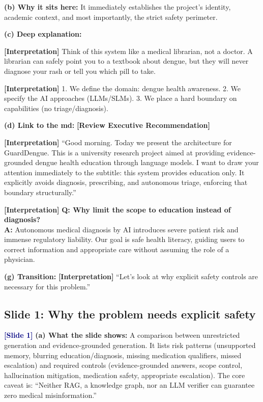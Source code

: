 \documentclass[11pt,a4paper]{article}
\newcommand{\origintag}[2]{\textcolor{#1}{\small\textbf{[#2]}}}
\begin{document}
\textbf{(b) Why it sits here:} It immediately establishes the project's identity, academic context, and most importantly, the strict safety perimeter.

\textbf{(c) Deep explanation:}
\begin{analogy}
\origintag{slate}{Interpretation} Think of this system like a medical librarian, not a doctor. A librarian can safely point you to a textbook about dengue, but they will never diagnose your rash or tell you which pill to take.
\end{analogy}
\origintag{slate}{Interpretation} 1. We define the domain: dengue health awareness. 2. We specify the AI approaches (LLMs/SLMs). 3. We place a hard boundary on capabilities (no triage/diagnosis).

\textbf{(d) Link to the md:} \origintag{amber}{Review Executive Recommendation}

\begin{sayit}
\origintag{slate}{Interpretation} ``Good morning. Today we present the architecture for GuardDengue. This is a university research project aimed at providing evidence-grounded dengue health education through language models. I want to draw your attention immediately to the subtitle: this system provides education only. It explicitly avoids diagnosis, prescribing, and autonomous triage, enforcing that boundary structurally.''
\end{sayit}

\begin{qa}
\origintag{slate}{Interpretation} \textbf{Q: Why limit the scope to education instead of diagnosis?} \\
\textbf{A:} Autonomous medical diagnosis by AI introduces severe patient risk and immense regulatory liability. Our goal is safe health literacy, guiding users to correct information and appropriate care without assuming the role of a physician.
\end{qa}
\textbf{(g) Transition:} \origintag{slate}{Interpretation} ``Let's look at why explicit safety controls are necessary for this problem.''

\subsection{Slide 1: Why the problem needs explicit safety}
\origintag{navy}{Slide 1} 
\textbf{(a) What the slide shows:} A comparison between unrestricted generation and evidence-grounded generation. It lists risk patterns (unsupported memory, blurring education/diagnosis, missing medication qualifiers, missed escalation) and required controls (evidence-grounded answers, scope control, hallucination mitigation, medication safety, appropriate escalation). The core caveat is: ``Neither RAG, a knowledge graph, nor an LLM verifier can guarantee zero medical misinformation.''
\end{document}
